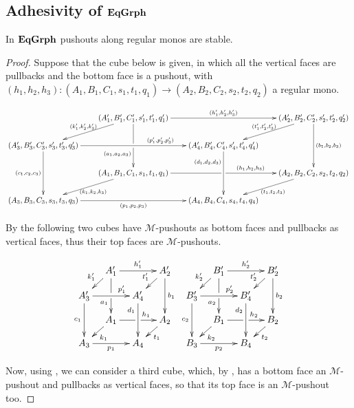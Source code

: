 \subsection{Adhesivity of $\mathbf{EqGrph}$}

\begin{lemma}\label{lem:stab}
In $\mathbf{EqGrph}$ pushouts along regular monos are stable.
\end{lemma}
\begin{proof}
	Suppose that the cube below is given, in which all the vertical faces are pullbacks and the bottom face is a pushout, with $(h_1, h_2, h_3)\colon (A_1,B_1,C_1, s_1,t_1,q_1)\to (A_2,B_2,C_2, s_2,t_2,q_2)$ a regular mono.
	
		\[\xymatrix@C=20pt@R=20pt{&(A'_1,B'_1,C'_1, s'_1,t'_1,q'_1)\ar[dd]|\hole_(.65){(a_1, a_2, a_3)}\ar[rr]^{(h'_1, h'_2, h'_3)} \ar[dl]_{(k'_1, k'_2, k'_3)} && (A'_2,B'_2,C'_2, s'_2,t'_2,q'_2) \ar[dd]^{(b_1, b_2, b_3)} \ar[dl]_{(t'_1, t'_2, t'_3)} \\ (A'_3,B'_3,C'_3, s'_3,t'_3,q'_3) \ar[dd]_{(c_1, c_2, c_3)}\ar[rr]^(.65){(p'_1,p'_2,p'_3)} & & (A'_4,B'_4,C'_4, s'_4,t'_4,q'_4) \ar[dd]_(.3){(d_1, d_2, d_3)}\\&(A_1,B_1,C_1, s_1,t_1,q_1)\ar[rr]|\hole^(.65){(h_1, h_2, h_3)} \ar[dl]^{(k_1, k_2, k_3)} && (A_2,B_2,C_2, s_2,t_2,q_2) \ar[dl]^{(t_1, t_2, t_3)} \\(A_3,B_3,C_3, s_3,t_3,q_3) \ar[rr]_{(p_1, p_2, p_3)} & & (A_4,B_4,C_4, s_4,t_4,q_4)}\]

By  the following two cubes have $\mathcal{M}$-pushouts as bottom faces and pullbacks as vertical faces, thus their top faces are $\mathcal{M}$-pushouts.

\[\xymatrix@C=10pt@R=10pt{&A'_1\ar[dd]|\hole_(.65){a_1}\ar[rr]^{h'_1} \ar[dl]_{k'_1} && A'_2 \ar[dd]^{b_1} \ar[dl]_{t'_1} && B'_1\ar[dd]|\hole_(.65){a_2}\ar[rr]^{h'_2} \ar[dl]_{k'_2} && B'_2 \ar[dd]^{b_2} \ar[dl]_{t'_2}\\ A'_3  \ar[dd]_{c_1}\ar[rr]^(.7){p'_1} & & A'_4 \ar[dd]_(.3){d_1} &&B'_3  \ar[dd]_{c_2}\ar[rr]^(.7){p'_2} & & B'_4 \ar[dd]_(.3){d_2}\\&A_1\ar[rr]|\hole^(.65){h_1} \ar[dl]^{k_1} && A_2 \ar[dl]^{t_1} && B_1\ar[rr]|\hole^(.65){h_2} \ar[dl]^{k_2} && B_2 \ar[dl]^{t_2} \\A_3 \ar[rr]_{p_1} & & A_4&&B_3 \ar[rr]_{p_2} & & B_4}\]

Now,  using , we can consider a third cube, which, by , has a bottom face an $\mathcal{M}$-pushout and pullbacks as vertical faces, so that its top face is an $\mathcal{M}$-pushout too.


\end{proof}
